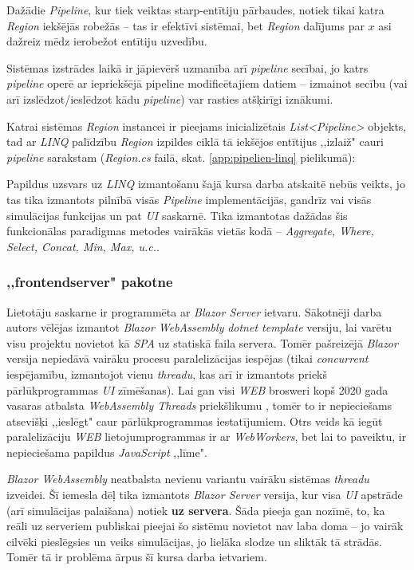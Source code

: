 Dažādie \emph{Pipeline}, kur tiek veiktas starp-entītiju pārbaudes, notiek tikai
katra \emph{Region} iekšējās robežās -- tas ir efektīvi sistēmai, bet \emph{Region}
dalījums par \(x\) asi dažreiz mēdz ierobežot entītiju uzvedību.

Sistēmas izstrādes laikā ir jāpievērš uzmanība arī \emph{pipeline} secībai, jo katrs \emph{pipeline}
operē ar iepriekšējā pipeline modificētajiem datiem -- izmainot secību
(vai arī izslēdzot/ieslēdzot kādu \emph{pipeline}) var rasties atšķirīgi iznākumi.

Katrai sistēmas \emph{Region} instancei ir pieejams inicializētais \emph{List<Pipeline>}
objekts, tad ar \emph{LINQ} palīdzību \emph{Region} izpildes ciklā tā iekšējos entītijus
,,izlaiž" cauri \emph{pipeline} sarakstam (\emph{Region.cs} failā, skat. \ref{app:pipelien-linq} pielikumā):

Papildus uzsvars uz \emph{LINQ} izmantošanu šajā kursa darba atskaitē nebūs veikts,
jo tas tika izmantots pilnībā visās \emph{Pipeline} implementācijās, gandrīz vai
visās simulācijas funkcijas un pat \emph{UI} saskarnē. Tika izmantotas dažādas šis
funkcionālas paradigmas metodes vairākās vietās kodā -- \emph{Aggregate, Where, Select, Concat, Min, Max, u.c.}.


\subsubsection{,,frontendserver" pakotne}


Lietotāju saskarne ir programmēta ar \emph{Blazor Server} ietvaru. Sākotnēji darba
autors vēlējas izmantot \emph{Blazor WebAssembly} \emph{dotnet template} versiju,
lai varētu visu projektu novietot kā \emph{SPA}\cite{progr:SPA} uz statiskā faila servera. Tomēr
pašreizējā \emph{Blazor} versija nepiedāvā vairāku procesu paralelizācijas iespējas
(tikai \emph{concurrent} iespējamību, izmantojot vienu \emph{threadu}, kas arī ir
izmantots priekš pārlūkprogrammas \emph{UI} zīmēšanas)\cite{csharp:blazor-no-multithreaded-support}. Lai gan
visi \emph{WEB} brosweri kopš 2020 gada vasaras atbalsta \emph{WebAssembly Threads}
priekšlikumu \cite{wasm:threads-proposal}, tomēr to ir nepieciešams atsevišķi
,,ieslēgt" caur pārlūkprogrammas iestatījumiem. Otrs veids kā iegūt paralelizāciju \emph{WEB}
lietojumprogrammas ir ar \emph{WebWorkers}, bet lai to paveiktu, ir nepieciešama
papildus \emph{JavaScript} ,,līme".

\emph{Blazor WebAssembly} neatbalsta nevienu variantu vairāku
sistēmas \emph{threadu} izveidei. Šī iemesla dēļ tika izmantots \emph{Blazor Server}
versija, kur visa \emph{UI} apstrāde (arī simulācijas palaišana) notiek \textbf{uz servera}. Šāda
pieeja gan nozīmē, to, ka reāli uz serveriem publiskai pieejai šo sistēmu novietot nav laba doma -- jo
vairāk cilvēki pieslēgsies un veiks simulācijas, jo lielāka slodze un sliktāk tā strādās.
Tomēr tā ir problēma ārpus šī kursa darba ietvariem.

